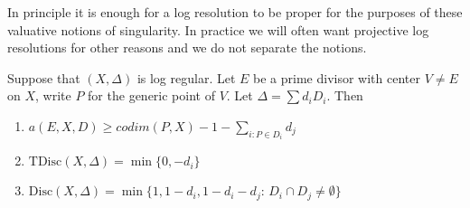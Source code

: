 \begin{remark}
	
	In principle it is enough for a log resolution to be proper for the purposes of these valuative notions of singularity. In practice we will often want projective log resolutions for other reasons and we do not separate the notions.
	
	\end{remark}

\begin{lemma}
	Suppose that $(X,\Delta)$ is log regular. Let $E$ be a prime divisor with center $V\neq E$ on $X$, write $P$ for the generic point of $V$. Let $\Delta= \sum d_{i}D_{i}$.
	Then \begin{enumerate}
		\item $a(E,X,D)\geq codim(P,X) -1-\sum_{i: P\in D_{i}}d_{j}$
		\item $\text{TDisc}(X,\Delta)=\min\{0,-d_{i}\}$
		\item $\text{Disc}(X,\Delta) =\min\{1,1-d_{i},1-d_{i}-d_{j}\text{: } D_{i} \cap D_{j}\neq \emptyset\}$

	\end{enumerate}
\end{lemma}
